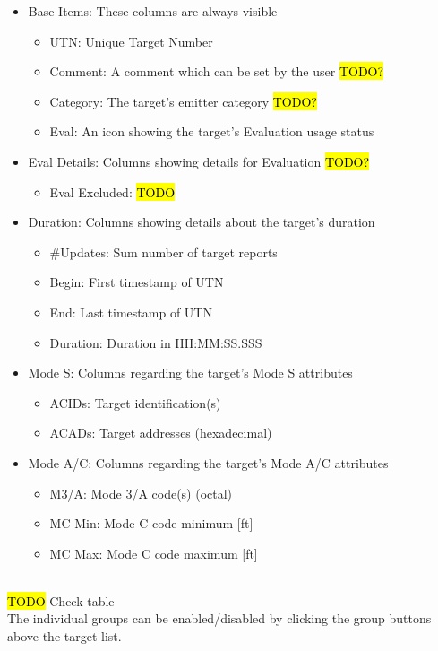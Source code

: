 \begin{itemize}  
\item Base Items: These columns are always visible
\begin{itemize}  
  \item UTN: Unique Target Number
  \item Comment: A comment which can be set by the user \hl{TODO?}
  \item Category: The target's emitter category \hl{TODO?}
  \item Eval: An icon showing the target's Evaluation usage status
\end{itemize}
\item Eval Details: Columns showing details for Evaluation \hl{TODO?}
\begin{itemize}  
  \item Eval Excluded: \hl{TODO}
\end{itemize}
\item Duration: Columns showing details about the target's duration
\begin{itemize}  
  \item \#Updates: Sum number of target reports 
  \item Begin: First timestamp of UTN
  \item End: Last timestamp of UTN
  \item Duration: Duration in HH:MM:SS.SSS
\end{itemize}
\item Mode S: Columns regarding the target's Mode S attributes
\begin{itemize}  
  \item ACIDs: Target identification(s)
  \item ACADs: Target addresses (hexadecimal)
\end{itemize}
\item Mode A/C: Columns regarding the target's Mode A/C attributes
\begin{itemize}  
  \item M3/A: Mode 3/A code(s) (octal)
  \item MC Min: Mode C code minimum [ft]
  \item MC Max: Mode C code maximum [ft]
\end{itemize}
\end{itemize}
\ \\

\hl{TODO} Check table \\

The individual groups can be enabled/disabled by clicking the group buttons above the target list. \\

